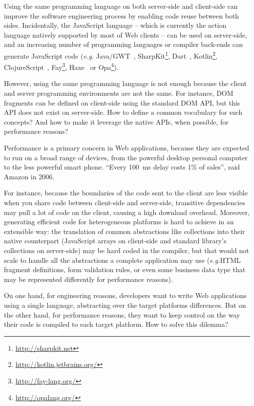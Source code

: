 \documentclass[preprint]{sigplanconf}
\newcommand{\eg}{\emph{e.g.}}
\begin{document}
Using the same programming language on both server-side and client-side can improve the software engineering
process by enabling code reuse between both sides. Incidentally, the JavaScript language -- which is currently the
action language natively supported by most of Web clients -- can be used on server-side, and an increasing
number of programming languages or compiler back-ends can generate JavaScript code (\eg
Java/GWT~\cite{Chaganti07_GWT}, SharpKit\footnote{\href{http://sharpkit.net}{http://sharpkit.net}},
Dart~\cite{Griffith11_Dart}, Kotlin\footnote{\href{http://kotlin.jetbrains.org/}{http://kotlin.jetbrains.org/}},
ClojureScript~\cite{McGranaghan11_ClojureScript}, Fay\footnote{\href{http://fay-lang.org/}{http://fay-lang.org/}},
Haxe~\cite{Cannasse08_HaXe} or Opa\footnote{\href{http://opalang.org/}{http://opalang.org/}}).

However, using the same programming language is not enough because the client and server programming environments
are not the same. For instance, DOM fragments can be defined on client-side using the standard DOM API, but this
API does not exist on server-side. How to define a common vocabulary for such concepts? And how to make it leverage
the native APIs, when possible, for performance reasons?

Performance is a primary concern in Web applications, because they are expected to run on a broad range of devices,
from the powerful desktop personal computer to the less powerful smart phone. “Every 100~ms delay costs 1\% of
sales”, said Amazon in 2006.

For instance, because the boundaries of the code sent to the client are less visible when you share code between
client-side and server-side, transitive dependencies may pull a lot of code on the client, causing a high download
overhead. Moreover, generating efficient code for heterogeneous platforms is hard to achieve in an extensible way:
the translation of common abstractions like collections into their native counterpart (JavaScript arrays on
client-side and standard library's collections on server-side) may be hard coded in the compiler, but that would not
scale to handle all the abstractions a complete application may use (\eg HTML fragment definitions, form validation
rules, or even some business data type that may be represented differently for performance reasons).

On one hand, for engineering reasons, developers want to write Web applications using a single language, abstracting
over the target platforms differences. But on the other hand, for performance reasons, they want to keep
control on the way their code is compiled to each target platform. How to solve this dilemma?
\end{document}
